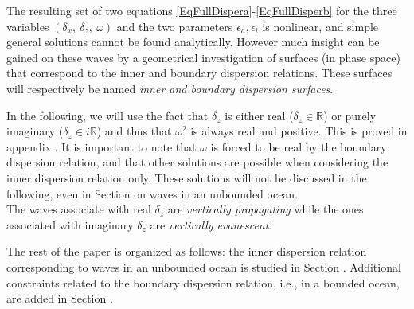 \documentclass[a4paper,11pt]{article}
\begin{document}
The resulting set of two equations \ref{EqFullDispera}-\ref{EqFullDisperb} for the three variables $(\delta_x,\  \delta_z,\ \omega)$ and the two parameters $\epsilon_a, \epsilon_i$ is nonlinear, and simple general solutions cannot be found analytically. However much insight can be gained on these waves by a geometrical investigation of surfaces (in phase space) that correspond to the inner and boundary dispersion relations. 
These surfaces will respectively be named \textit{inner and boundary dispersion surfaces}.

In the following, we will use the fact that $\delta_z$ is either real ($\delta_z \in \mathbb{R}$) or purely imaginary ($\delta_z \in i\mathbb{R}$) and thus that $\omega^2$ is always real and positive. This is proved in appendix .
It is important to note that $\omega$ is forced to be real by the boundary dispersion relation, and that other solutions are possible when considering the inner dispersion relation only. These solutions will not be discussed in the following, even in Section  on waves in an unbounded ocean.\\
The waves associate with real $\delta_z$ are {\it vertically propagating} while the ones associated with imaginary $\delta_z$ are {\it vertically evanescent}.

The rest of the paper is organized as follows: the inner dispersion relation corresponding to waves in an unbounded ocean is studied in Section . Additional constraints related to the boundary dispersion relation, i.e., in a bounded ocean, are added in Section .
\end{document}
